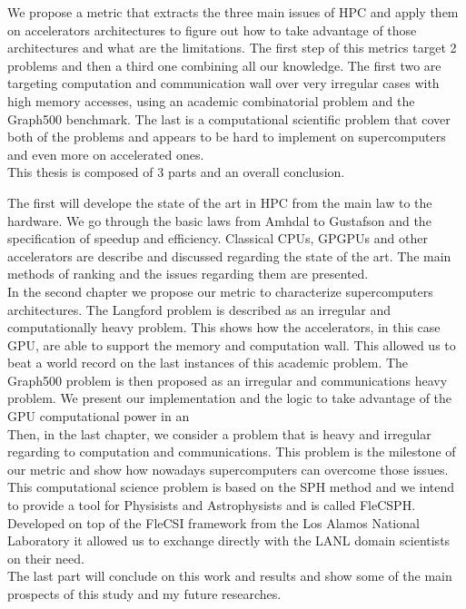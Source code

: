 We propose a metric that extracts the three main issues of HPC and apply them on accelerators architectures to figure out how to take advantage of those architectures and what are the limitations. 
The first step of this metrics target 2 problems and then a third one combining all our knowledge.
The first two are targeting computation and communication wall over very irregular cases with high memory accesses, using an academic combinatorial problem and the Graph500 benchmark. 
The last is a computational scientific problem that cover both of the problems and appears to be hard to implement on supercomputers and even more on accelerated ones.\\

This thesis is composed of 3 parts and an overall conclusion. 

The first will develope the state of the art in HPC from the main law to the hardware. 	
We go through the basic laws from Amhdal to Gustafson and the specification of speedup and efficiency.
Classical CPUs, GPGPUs and other accelerators are describe and discussed regarding the state of the art. 
The main methods of ranking and the issues regarding them are presented.\\ 

In the second chapter we propose our metric to characterize supercomputers architectures. 
The Langford problem is described as an irregular and computationally heavy problem.
This shows how the accelerators, in this case GPU, are able to support the memory and computation wall. 
This allowed us to beat a world record on the last instances of this academic problem.
The Graph500 problem is then proposed as an irregular and communications heavy problem. 
We present our implementation and the logic to take advantage of the GPU computational power in an \\

Then, in the last chapter, we consider a problem that is heavy and irregular regarding to computation and communications.
This problem is the milestone of our metric and show how nowadays supercomputers can overcome those issues. 
This computational science problem is based on the SPH method and we intend to provide a tool for Physisists and Astrophysists and is called FleCSPH. 
Developed on top of the FleCSI framework from the Los Alamos National Laboratory it allowed us to exchange directly with the LANL domain scientists on their need.\\

The last part will conclude on this work and results and show some of the main prospects of this study and my future researches. 